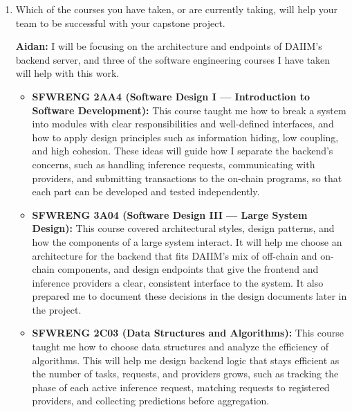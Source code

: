 \documentclass[12pt]{article}
\newcommand{\srref}[1]{SR\ref{#1}}
\begin{document}
\begin{enumerate}
\begin{itemize}
    must be more profitable than dishonest ones (\srref{SR_RewardAccuracy}).
    These later drove most of the staking, reputation, reward, and penalty
    functional requirements.
  \end{itemize}
  The three secondary stakeholder requirements on data privacy, protection,
  and retention (\srref{SR_DataPrivacy} to \srref{SR_DataRetention}) were
  inspired less by direct conversations and more by our own research into
  regulatory expectations and by the hazards identified in the Hazard
  Analysis. Similarly, most of the detailed functional requirements, such as
  the exact rules for acceptance periods, reputation updates, and slashing,
  were derived by the team from the stakeholder requirements rather than
  requested directly. In this sense, client and peer conversations set the
  goals of the system, while the team translated those goals into specific,
  testable behaviour.
  \item Which of the courses you have taken, or are currently taking, will help
  your team to be successful with your capstone project.

  \textbf{Aidan:} I will be focusing on the architecture and endpoints of
  DAIIM's backend server, and three of the software engineering courses I have
  taken will help with this work.
  \begin{itemize}
    \item \textbf{SFWRENG 2AA4 (Software Design I --- Introduction to Software
    Development):} This course taught me how to break a system into modules
    with clear responsibilities and well-defined interfaces, and how to apply
    design principles such as information hiding, low coupling, and high
    cohesion. These ideas will guide how I separate the backend's concerns,
    such as handling inference requests, communicating with providers, and
    submitting transactions to the on-chain programs, so that each part can be
    developed and tested independently.
    \item \textbf{SFWRENG 3A04 (Software Design III --- Large System Design):}
    This course covered architectural styles, design patterns, and how the
    components of a large system interact. It will help me choose an
    architecture for the backend that fits DAIIM's mix of off-chain and
    on-chain components, and design endpoints that give the frontend and
    inference providers a clear, consistent interface to the system. It also
    prepared me to document these decisions in the design documents later in
    the project.
    \item \textbf{SFWRENG 2C03 (Data Structures and Algorithms):} This course
    taught me how to choose data structures and analyze the efficiency of
    algorithms. This will help me design backend logic that stays efficient as
    the number of tasks, requests, and providers grows, such as tracking the
    phase of each active inference request, matching requests to registered
    providers, and collecting predictions before aggregation.
    \end{itemize}



\end{enumerate}
\end{document}
